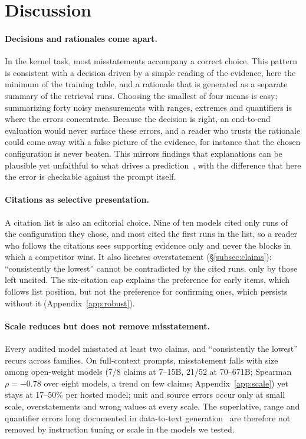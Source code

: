 \section{Discussion}
\label{sec:discussion}
\paragraph{Decisions and rationales come apart.}
In the kernel task, most misstatements accompany a correct choice. This pattern is consistent with a decision driven by a simple reading of the evidence, here the minimum of the training table, and a rationale that is generated as a separate summary of the retrieval runs. Choosing the smallest of four means is easy; summarizing forty noisy measurements with ranges, extremes and quantifiers is where the errors concentrate. Because the decision is right, an end-to-end evaluation would never surface these errors, and a reader who trusts the rationale could come away with a false picture of the evidence, for instance that the chosen configuration is never beaten. This mirrors findings that explanations can be plausible yet unfaithful to what drives a prediction~\cite{Jacovi2020Faithfulness,Turpin2023Unfaithful}, with the difference that here the error is checkable against the prompt itself.

\paragraph{Citations as selective presentation.}
A citation list is also an editorial choice. Nine of ten models cited only runs of the configuration they chose, and most cited the first runs in the list, so a reader who follows the citations sees supporting evidence only and never the blocks in which a competitor wins. It also licenses overstatement (\S\ref{subsec:claims}): ``consistently the lowest'' cannot be contradicted by the cited runs, only by those left uncited. The six-citation cap explains the preference for early items, which follows list position, but not the preference for confirming ones, which persists without it (Appendix~\ref{app:robust}).

\paragraph{Scale reduces but does not remove misstatement.}
Every audited model misstated at least two claims, and ``consistently the lowest'' recurs across families. On full-context prompts, misstatement falls with size among open-weight models (7/8 claims at 7--15B, 21/52 at 70--671B; Spearman $\rho=-0.78$ over eight models, a trend on few claims; Appendix~\ref{app:scale}) yet stays at 17--50\% per hosted model; unit and source errors occur only at small scale, overstatements and wrong values at every scale. The superlative, range and quantifier errors long documented in data-to-text generation~\cite{Thomson2020GoldStandard,Chen2020LogicNLG} are therefore not removed by instruction tuning or scale in the models we tested.

